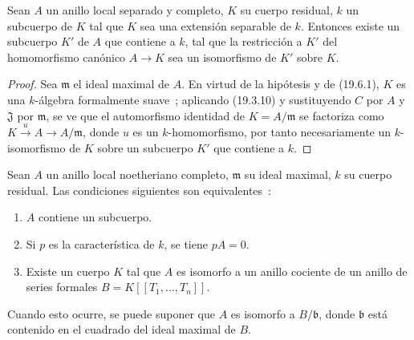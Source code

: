\begin{corollary}[19.6.2]
\label{0.19.6.2-fr}
Sean $A$ un anillo local separado y completo, $K$ su cuerpo residual, $k$ un
subcuerpo de $K$ tal que $K$ sea una extensión separable de $k$. Entonces
existe un subcuerpo $K'$ de $A$ que contiene a $k$, tal que la restricción a $K'$
del homomorfismo canónico $A\to K$ sea un isomorfismo de $K'$ sobre $K$.
\end{corollary}

\begin{proof}
Sea $\mathfrak m$ el ideal maximal de $A$. En virtud de la hipótesis y de
(19.6.1), $K$ es una $k$-álgebra formalmente suave~; aplicando (19.3.10) y
sustituyendo $C$ por $A$ y $\mathfrak J$ por $\mathfrak m$, se ve que
el automorfismo identidad de $K=A/\mathfrak m$ se factoriza como
$K\xrightarrow{u}A\to A/\mathfrak m$, donde $u$ es un $k$-homomorfismo, por tanto
necesariamente un $k$-isomorfismo de $K$ sobre un subcuerpo $K'$ que contiene a
$k$.
\end{proof}

\begin{corollary}[19.6.3]
\label{0.19.6.3-fr}
Sean $A$ un anillo local noetheriano completo, $\mathfrak m$ su ideal maximal,
$k$ su cuerpo residual. Las condiciones siguientes son equivalentes~:
\begin{enumerate}
  \item[\textup{a)}] $A$ contiene un subcuerpo.
  \item[\textup{b)}] Si $p$ es la característica de $k$, se tiene $pA=0$.
  \item[\textup{c)}] Existe un cuerpo $K$ tal que $A$ es isomorfo a un anillo
  cociente de un anillo de series formales $B=K[[T_1,\ldots,T_n]]$.
\end{enumerate}
Cuando esto ocurre, se puede suponer que $A$ es isomorfo a $B/\mathfrak b$,
donde $\mathfrak b$ está contenido en el cuadrado del ideal maximal de $B$.
\end{corollary}

